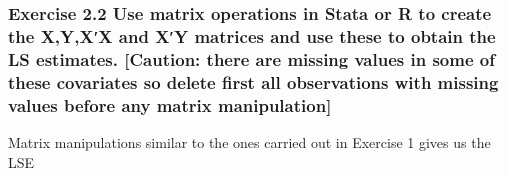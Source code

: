 \documentclass[
  letterpaper,
  DIV=11,
  numbers=noendperiod]{scrreprt}
\begin{document}
\subsubsection*{Exercise 2.2 Use matrix operations in Stata or R to
create the X,Y,X′X and X′Y matrices and use these to obtain the LS
estimates. {[}Caution: there are missing values in some of these
covariates so delete first all observations with missing values before
any matrix
manipulation{]}}\label{exercise-2.2-use-matrix-operations-in-stata-or-r-to-create-the-xyxx-and-xy-matrices-and-use-these-to-obtain-the-ls-estimates.-caution-there-are-missing-values-in-some-of-these-covariates-so-delete-first-all-observations-with-missing-values-before-any-matrix-manipulation}

Matrix manipulations similar to the ones carried out in Exercise 1 gives
us the LSE
\end{document}
